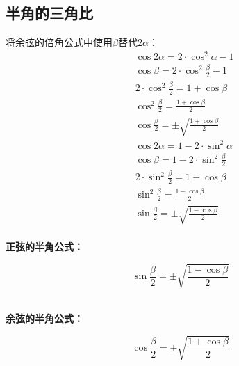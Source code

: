 \documentclass[UTF8]{ctexart}
\begin{document}
\subsection{半角的三角比}
    将余弦的倍角公式中使用$\beta$替代$2\alpha$：\\
    \setcounter{equation}{0}
    \begin{align}
        &\cos{2\alpha}=2\cdot\cos^2{\alpha}-1\\[3mm]
        &\cos{\beta}=2\cdot\cos^2{\frac{\beta}{2}}-1\\[3mm]
        &2\cdot\cos^2{\frac{\beta}{2}}=1+\cos{\beta}\\[3mm]
        &\cos^2{\frac{\beta}{2}}=\frac{1+\cos{\beta}}{2}\\[3mm]
        &\cos{\frac{\beta}{2}}=\pm\sqrt{\frac{1+\cos{\beta}}{2}}\\[8mm]
        &\cos{2\alpha}=1-2\cdot\sin^2{\alpha}\\[3mm]
        &\cos{\beta}=1-2\cdot\sin^2{\frac{\beta}{2}}\\[3mm]
        &2\cdot\sin^2{\frac{\beta}{2}}=1-\cos{\beta}\\[3mm]
        &\sin^2{\frac{\beta}{2}}=\frac{1-\cos{\beta}}{2}\\[3mm]
        &\sin{\frac{\beta}{2}}=\pm\sqrt{\frac{1-\cos{\beta}}{2}}
    \end{align}\\
    \newline
    \textbf{正弦的半角公式：}
    \begin{large}
    \begin{equation*}
        \sin{\frac{\beta}{2}}=\pm\sqrt{\frac{1-\cos{\beta}}{2}}
    \end{equation*}        
    \end{large}\\
    \textbf{余弦的半角公式：}
    \begin{large}
    \begin{equation*}
        \cos{\frac{\beta}{2}}=\pm\sqrt{\frac{1+\cos{\beta}}{2}}
    \end{equation*}
    \end{large}
\end{document}
